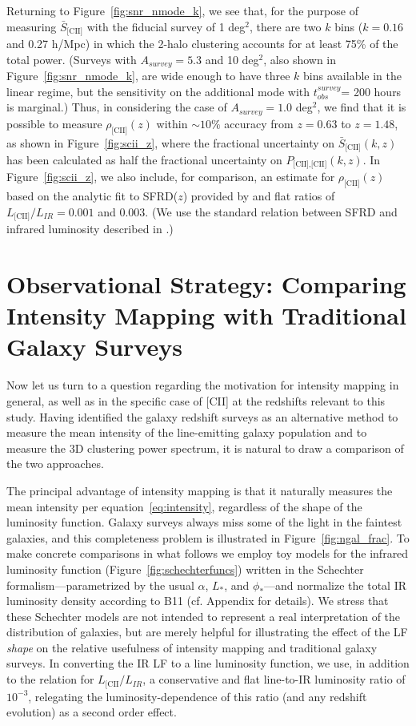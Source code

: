 \documentclass[iop]{emulateapj}
\begin{document}
Returning to Figure~\ref{fig:snr_nmode_k}, we see that, for the purpose of measuring $\bar{S}_{\textrm{[CII]}}$ with the fiducial survey of 1 deg$^2$, there are two $k$ bins ($k = 0.16$ and 0.27 h/Mpc) in which the 2-halo clustering accounts for at least 75\% of the total power. (Surveys with $A_{survey} = 5.3$ and 10 deg$^2$, also shown in Figure~\ref{fig:snr_nmode_k}, are wide enough to have three $k$ bins available in the linear regime, but the sensitivity on the additional mode with $t_{obs}^{survey}$= 200 hours is marginal.) Thus, in considering the case of $A_{survey} = 1.0$ deg$^2$, we find that it is possible to measure $\rho_{\textrm{[CII]}}(z)$ within $\sim10\%$ accuracy from $z = 0.63$ to $z=1.48$, as shown in Figure~\ref{fig:scii_z}, where the fractional uncertainty on $\bar{S}_{\textrm{[CII]}}(k,z)$ has been calculated as half the fractional uncertainty on $P_{\textrm{[CII],[CII]}}(k,z)$. In Figure~\ref{fig:scii_z}, we also include, for comparison, an estimate for $\rho_{\textrm{[CII]}}(z)$ based on the analytic fit to SFRD($z$) provided by \citet{hb06} and flat ratios of $L_{\textrm{[CII]}}/L_{IR} = 0.001$ and 0.003. (We use the standard relation between SFRD and infrared luminosity described in \citet{kennicutt98}.)

\section{Observational Strategy: Comparing Intensity Mapping with Traditional Galaxy Surveys}

Now let us turn to a question regarding the motivation for intensity mapping in general, as well as in the specific case of [CII] at the redshifts relevant to this study. Having identified the galaxy redshift surveys as an alternative method to measure the mean intensity of the line-emitting galaxy population and to measure the 3D clustering power spectrum, it is natural to draw a comparison of the two approaches. 

The principal advantage of intensity mapping is that it naturally measures the mean intensity per equation~\ref{eq:intensity}, regardless of the shape of the luminosity function. Galaxy surveys always miss some of the light in the faintest galaxies, and this completeness problem is illustrated in Figure~\ref{fig:ngal_frac}. To make concrete comparisons in what follows we employ toy models for the infrared luminosity function (Figure~\ref{fig:schechterfuncs}) written in the Schechter formalism---parametrized by the usual $\alpha$, $L_*$, and $\phi_*$---and normalize the total IR luminosity density according to B11 (cf. Appendix for details). We stress that these Schechter models are not intended to represent a real interpretation of the distribution of galaxies, but are merely helpful for illustrating the effect of the LF \emph{shape} on the relative usefulness of intensity mapping and traditional galaxy surveys. In converting the IR LF to a line luminosity function, we use, in addition to the \citet{spinoglio12} relation for $L_{\textrm{[CII}}/L_{IR}$, a conservative and flat line-to-IR luminosity ratio of $10^{-3}$, relegating the luminosity-dependence of this ratio (and any redshift evolution) as a second order effect. 
\end{document}
